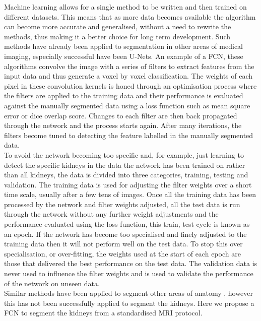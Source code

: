 Machine learning allows for a single method to be written and then trained on different datasets. This means that as more data becomes available the algorithm can become more accurate and generalised, without a need to rewrite the methods, thus making it a better choice for long term development. Such methods have already been applied to segmentation in other areas of medical imaging, especially successful have been U-Nets. An example of a \ac{FCN}, these algorithms convolve the image with a series of filters to extract features from the input data and thus generate a voxel by voxel classification. The weights of each pixel in these convolution kernels is honed through an optimisation process where the filters are applied to the training data and their performance is evaluated against the manually segmented data using a loss function such as mean square error or dice overlap score. Changes to each filter are then back propagated through the network and the process starts again. After many iterations, the filters become tuned to detecting the feature labelled in the manually segmented data.\\ 

To avoid the network becoming too specific and, for example, just learning to detect the specific kidneys in the data the network has been trained on rather than all kidneys, the data is divided into three categories, training, testing and validation. The training data is used for adjusting the filter weights over a short time scale, usually after a few tens of images. Once all the training data has been processed by the network and filter weights adjusted, all the test data is run through the network without any further weight adjustments and the performance evaluated using the loss function, this train, test cycle is known as an epoch. If the network has become too specialised and finely adjusted to the training data then it will not perform well on the test data. To stop this over specialisation, or over-fitting, the weights used at the start of each epoch are those that delivered the best performance on the test data. The validation data is never used to influence the filter weights and is used to validate the performance of the network on unseen data.\\

Similar methods have been applied to segment other areas of anatomy \cite{wachinger_deepnat_2018, lu_automatic_2017}, however this has not been successfully applied to segment the kidneys. Here we propose a \ac{FCN} to segment the kidneys from a standardised \ac{MRI} protocol.


